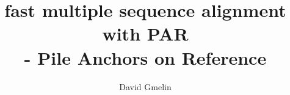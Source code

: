 


\title{fast multiple sequence alignment with PAR
\\\small - Pile Anchors on Reference}
\author{David Gmelin}
\maketitle
\tableofcontents






